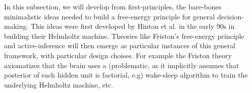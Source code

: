 \documentclass[10pt,letterpaper]{article}
\begin{document}
In this subsection, we will develop from first-principles, the bare-bones minimalistic ideas needed to build a free-energy principle for general decision-making. This ideas were first developed by Hinton et al. in the early 90s in building their Helmholtz machine. Theories like Friston's free-energy principle and active-inference will then emerge as particular instances of this general framework, with particular design choises. For example the Friston theory axiomatizes that the brain uses a (problematic, as it implicitly assumes that posterior of each hidden unit is factorial, e.g) wake-sleep algorithm to train the underlying Helmholtz machine, etc.

\end{document}
